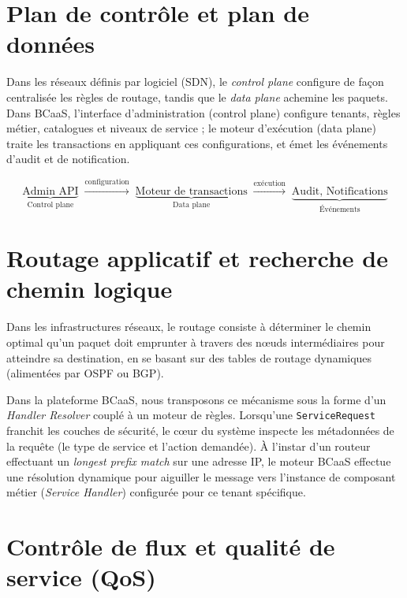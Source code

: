\section{Plan de contrôle et plan de données}

\begin{analogie}
Dans les réseaux définis par logiciel (SDN), le \emph{control plane} configure de façon
centralisée les règles de routage, tandis que le \emph{data plane} achemine les paquets.
Dans BCaaS, l'interface d'administration (control plane) configure tenants, règles métier,
catalogues et niveaux de service ; le moteur d'exécution (data plane) traite les
transactions en appliquant ces configurations, et émet les événements d'audit et de
notification.

\[
\underbrace{\text{Admin API}}_{\text{Control plane}}
\;\xrightarrow{\text{configuration}}\;
\underbrace{\text{Moteur de transactions}}_{\text{Data plane}}
\;\xrightarrow{\text{exécution}}\;
\underbrace{\text{Audit, Notifications}}_{\text{Événements}}
\]

\end{analogie}
\section{Routage applicatif et recherche de chemin logique}
\label{sec:routage_applicatif}

\begin{analogie}
Dans les infrastructures réseaux, le routage consiste à déterminer le chemin optimal qu'un paquet doit emprunter à travers des nœuds intermédiaires pour atteindre sa destination, en se basant sur des tables de routage dynamiques (alimentées par OSPF ou BGP). 

Dans la plateforme BCaaS, nous transposons ce mécanisme sous la forme d'un \emph{Handler Resolver} couplé à un moteur de règles. Lorsqu'une \texttt{ServiceRequest} franchit les couches de sécurité, le cœur du système inspecte les métadonnées de la requête (le type de service et l'action demandée). À l'instar d'un routeur effectuant un \emph{longest prefix match} sur une adresse IP, le moteur BCaaS effectue une résolution dynamique pour aiguiller le message vers l'instance de composant métier (\emph{Service Handler}) configurée pour ce tenant spécifique.
\end{analogie}

\section{Contrôle de flux et qualité de service (QoS)}
\label{sec:qos_flux}

